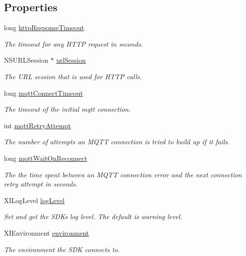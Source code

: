 \subsection*{Properties}
\begin{DoxyCompactItemize}
\item 
long \hyperlink{class_x_i_sdk_config_a721a1a7c8f44e42eb79defd955bf1d17}{http\+Response\+Timeout}
\begin{DoxyCompactList}\small\item\em The timeout for any H\+T\+TP request in seconds. \end{DoxyCompactList}\item 
N\+S\+U\+R\+L\+Session $\ast$ \hyperlink{class_x_i_sdk_config_a01bb2fc51f6bca0e8a5bd32281abeee7}{url\+Session}
\begin{DoxyCompactList}\small\item\em The U\+RL session that is used for H\+T\+TP calls. \end{DoxyCompactList}\item 
long \hyperlink{class_x_i_sdk_config_abd757758fc57eeb6b4962078944675d4}{mqtt\+Connect\+Timeout}
\begin{DoxyCompactList}\small\item\em The timeout of the initial mqtt connection. \end{DoxyCompactList}\item 
int \hyperlink{class_x_i_sdk_config_ac8b3d3418421adc422c9cd5ce4c88582}{mqtt\+Retry\+Attempt}
\begin{DoxyCompactList}\small\item\em The number of attempts an M\+Q\+TT connection is tried to build up if it fails. \end{DoxyCompactList}\item 
long \hyperlink{class_x_i_sdk_config_a7e1114e4fbf145f2f9e88e5e0ecbe4cd}{mqtt\+Wait\+On\+Reconnect}
\begin{DoxyCompactList}\small\item\em The the time spent between an M\+Q\+TT connection error and the next connection retry attempt in seconds. \end{DoxyCompactList}\item 
X\+I\+Log\+Level \hyperlink{class_x_i_sdk_config_a564301d822062bec6a8062f08f916661}{log\+Level}
\begin{DoxyCompactList}\small\item\em Set and get the S\+DK\textquotesingle{}s log level. The default is warning level. \end{DoxyCompactList}\item 
X\+I\+Environment \hyperlink{class_x_i_sdk_config_acf4a6e964bf34ed131bd9b3a2324a186}{environment}
\begin{DoxyCompactList}\small\item\em The environment the S\+DK connects to. \end{DoxyCompactList}\end{DoxyCompactItemize}


